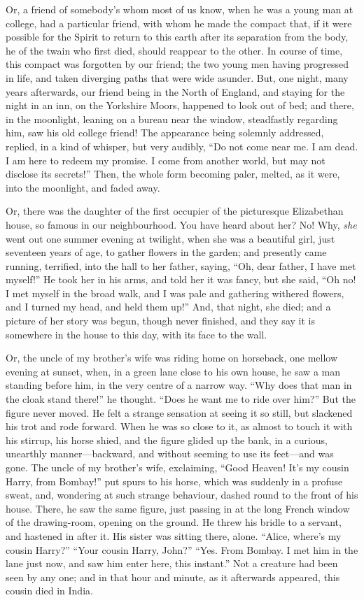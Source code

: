 Or, a friend of somebody's whom most of us know, when he was a young
man at college, had a particular friend, with whom he made the
compact that, if it were possible for the Spirit to return to this
earth after its separation from the body, he of the twain who first
died, should reappear to the other.  In course of time, this compact
was forgotten by our friend; the two young men having progressed in
life, and taken diverging paths that were wide asunder.  But, one
night, many years afterwards, our friend being in the North of
England, and staying for the night in an inn, on the Yorkshire
Moors, happened to look out of bed; and there, in the moonlight,
leaning on a bureau near the window, steadfastly regarding him, saw
his old college friend!  The appearance being solemnly addressed,
replied, in a kind of whisper, but very audibly, ``Do not come near
me.  I am dead.  I am here to redeem my promise.  I come from
another world, but may not disclose its secrets!''  Then, the whole
form becoming paler, melted, as it were, into the moonlight, and
faded away.

Or, there was the daughter of the first occupier of the picturesque
Elizabethan house, so famous in our neighbourhood.  You have heard
about her?  No!  Why, \emph{she} went out one summer evening at twilight,
when she was a beautiful girl, just seventeen years of age, to
gather flowers in the garden; and presently came running, terrified,
into the hall to her father, saying, ``Oh, dear father, I have met
myself!''  He took her in his arms, and told her it was fancy, but
she said, ``Oh no!  I met myself in the broad walk, and I was pale
and gathering withered flowers, and I turned my head, and held them
up!''  And, that night, she died; and a picture of her story was
begun, though never finished, and they say it is somewhere in the
house to this day, with its face to the wall.

Or, the uncle of my brother's wife was riding home on horseback, one
mellow evening at sunset, when, in a green lane close to his own
house, he saw a man standing before him, in the very centre of a
narrow way.  ``Why does that man in the cloak stand there!'' he
thought.  ``Does he want me to ride over him?''  But the figure never
moved.  He felt a strange sensation at seeing it so still, but
slackened his trot and rode forward.  When he was so close to it, as
almost to touch it with his stirrup, his horse shied, and the figure
glided up the bank, in a curious, unearthly manner---backward, and
without seeming to use its feet---and was gone.  The uncle of my
brother's wife, exclaiming, ``Good Heaven!  It's my cousin Harry,
from Bombay!'' put spurs to his horse, which was suddenly in a
profuse sweat, and, wondering at such strange behaviour, dashed
round to the front of his house.  There, he saw the same figure,
just passing in at the long French window of the drawing-room,
opening on the ground.  He threw his bridle to a servant, and
hastened in after it.  His sister was sitting there, alone.  ``Alice,
where's my cousin Harry?''  ``Your cousin Harry, John?''  ``Yes.  From
Bombay.  I met him in the lane just now, and saw him enter here,
this instant.''  Not a creature had been seen by any one; and in that
hour and minute, as it afterwards appeared, this cousin died in
India.


